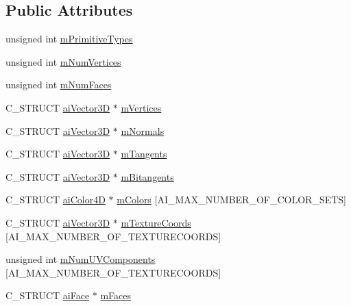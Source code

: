 \subsection*{Public Attributes}
\begin{DoxyCompactItemize}
\item 
unsigned int \hyperlink{structai_mesh_a99d66ac0a444068c1b252b30265cbf53}{m\+Primitive\+Types}
\item 
unsigned int \hyperlink{structai_mesh_ab34b7b5941e6636f1c08f615cbb072ef}{m\+Num\+Vertices}
\item 
unsigned int \hyperlink{structai_mesh_aeed22ee6963b79548f3877b3c905518e}{m\+Num\+Faces}
\item 
C\+\_\+\+S\+T\+R\+U\+C\+T \hyperlink{structai_vector3_d}{ai\+Vector3\+D} $\ast$ \hyperlink{structai_mesh_afd4588abb3e1c72821ae0234a3850662}{m\+Vertices}
\item 
C\+\_\+\+S\+T\+R\+U\+C\+T \hyperlink{structai_vector3_d}{ai\+Vector3\+D} $\ast$ \hyperlink{structai_mesh_aec81b496b4d93838cef038933dabe9b9}{m\+Normals}
\item 
C\+\_\+\+S\+T\+R\+U\+C\+T \hyperlink{structai_vector3_d}{ai\+Vector3\+D} $\ast$ \hyperlink{structai_mesh_af367ff78bd69f3e83d7edc8ad67dc5df}{m\+Tangents}
\item 
C\+\_\+\+S\+T\+R\+U\+C\+T \hyperlink{structai_vector3_d}{ai\+Vector3\+D} $\ast$ \hyperlink{structai_mesh_ab2a81bfe1731f01271ebab274a8f01c4}{m\+Bitangents}
\item 
C\+\_\+\+S\+T\+R\+U\+C\+T \hyperlink{structai_color4_d}{ai\+Color4\+D} $\ast$ \hyperlink{structai_mesh_ad9215f67bd0c2277b10775a8adb66b96}{m\+Colors} \mbox{[}A\+I\+\_\+\+M\+A\+X\+\_\+\+N\+U\+M\+B\+E\+R\+\_\+\+O\+F\+\_\+\+C\+O\+L\+O\+R\+\_\+\+S\+E\+T\+S\mbox{]}
\item 
C\+\_\+\+S\+T\+R\+U\+C\+T \hyperlink{structai_vector3_d}{ai\+Vector3\+D} $\ast$ \hyperlink{structai_mesh_a4a50b11d00ef50f419c75cab0f6bddd6}{m\+Texture\+Coords} \mbox{[}A\+I\+\_\+\+M\+A\+X\+\_\+\+N\+U\+M\+B\+E\+R\+\_\+\+O\+F\+\_\+\+T\+E\+X\+T\+U\+R\+E\+C\+O\+O\+R\+D\+S\mbox{]}
\item 
unsigned int \hyperlink{structai_mesh_a635c631a6e66d32989d6b25b2a892d86}{m\+Num\+U\+V\+Components} \mbox{[}A\+I\+\_\+\+M\+A\+X\+\_\+\+N\+U\+M\+B\+E\+R\+\_\+\+O\+F\+\_\+\+T\+E\+X\+T\+U\+R\+E\+C\+O\+O\+R\+D\+S\mbox{]}
\item 
C\+\_\+\+S\+T\+R\+U\+C\+T \hyperlink{structai_face}{ai\+Face} $\ast$ \hyperlink{structai_mesh_a5a65fbc7fdea7f8d36f39047425ece07}{m\+Faces}
\item 

\end{DoxyCompactItemize}

